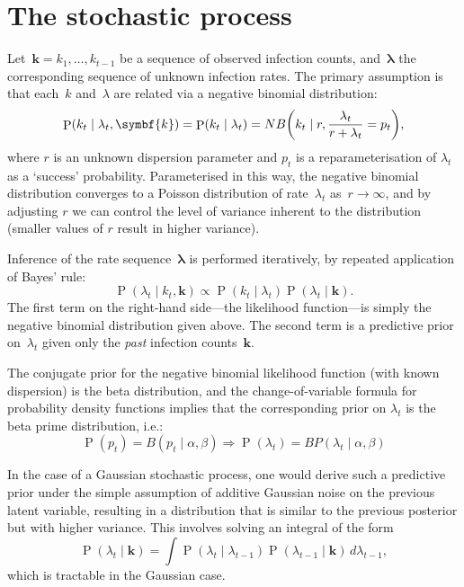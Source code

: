 \documentclass[12pt,a4paper]{article}
\newcommand\ub[1]{\symbf{#1}}                 %
\DeclareMathOperator\Pb{P}                    %
\DeclarePairedDelimiter\lr{\lparen}{\rparen}  %
\begin{document}
\section{The stochastic process} %

Let~$\ub{k} = k_1, \dots, k_{t-1}$ be a sequence of observed infection counts,
and~$\ub{\lambda}$ the corresponding sequence of unknown infection rates. The
primary assumption is that each~$k$ and~$\lambda$ are related via a negative
binomial distribution:
\begin{equation}\label{eqn:likelihood}
  \Pb(k_t \mid \lambda_t, \ub{k}) = \Pb(k_t \mid \lambda_t)
  = NB\lr*{k_t \mid r, \frac{\lambda_t}{r + \lambda_t} = p_t},
\end{equation}
where $r$ is an unknown dispersion parameter and $p_t$ is a reparameterisation
of $\lambda_t$ as a `success' probability. Parameterised in this way, the
negative binomial distribution converges to a Poisson distribution of
rate~$\lambda_t$ as~$r \to \infty$, and by adjusting $r$ we can control the
level of variance inherent to the distribution (smaller values of $r$ result in
higher variance).

Inference of the rate sequence~$\ub{\lambda}$ is performed iteratively, by
repeated application of Bayes' rule:
\begin{equation*}
  \Pb(\lambda_t \mid k_t, \ub{k}) \propto \Pb(k_t \mid \lambda_t)
    \Pb(\lambda_t \mid \ub{k}).
\end{equation*}
The first term on the right-hand side---the likelihood function---is simply the
negative binomial distribution given above. The second term is a predictive
prior on~$\lambda_t$ given only the \emph{past} infection counts~$\ub{k}$.

The conjugate prior for the negative binomial likelihood function (with known
dispersion) is the beta distribution, and the change-of-variable formula for
probability density functions implies that the corresponding prior on
$\lambda_t$ is the beta prime distribution, i.e.:
\begin{equation*}
  \Pb(p_t) = B(p_t \mid \alpha, \beta) \Rightarrow
    \Pb(\lambda_t) = BP(\lambda_t \mid \alpha, \beta)
\end{equation*}

In the case of a Gaussian stochastic process, one would derive such a predictive
prior under the simple assumption of additive Gaussian noise on the previous
latent variable, resulting in a distribution that is similar to the previous
posterior but with higher variance. This involves solving an integral of the
form
\begin{equation*}
  \Pb(\lambda_t \mid \ub{k}) = \int \Pb(\lambda_t \mid \lambda_{t-1})
    \Pb(\lambda_{t-1} \mid \ub{k})\, d\lambda_{t-1},
\end{equation*}
which is tractable in the Gaussian case.
\end{document}
